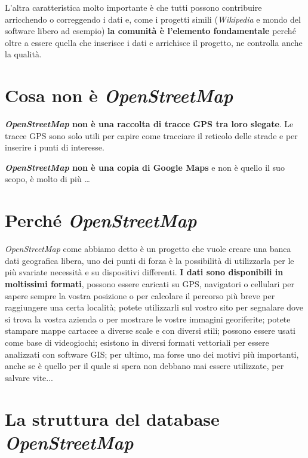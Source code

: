 \documentclass[a4paper,twoside,12pt,]{article}
\newcommand{\osm}{\emph{OpenStreetMap}\xspace}
\newcommand{\gps}{GPS\xspace}
\newcommand{\pro}[1]{\emph{#1}}
\begin{document}
L'altra caratteristica molto importante è che tutti possono contribuire arricchendo o correggendo i dati e, come i progetti simili (\pro{Wikipedia} e mondo del software libero ad esempio) \textbf{la comunità è l'elemento fondamentale} perché oltre a essere quella che inserisce i dati e arrichisce il progetto, ne controlla anche la qualità.
\section{Cosa non è \osm}
\textbf{\osm non è una raccolta di tracce \gps tra loro slegate}. Le tracce \gps sono solo utili per capire come tracciare il reticolo delle strade e per inserire i punti di interesse.

\textbf{\osm non è una copia di Google Maps} e non è quello il suo scopo, è molto di più \dots

\section{Perché \osm}
\osm come abbiamo detto è un progetto che vuole creare una banca dati geografica libera, uno dei punti di forza è la possibilità di utilizzarla per le più svariate necessità e su  dispositivi differenti. \textbf{I dati sono disponibili in moltissimi formati}, possono essere caricati su GPS, navigatori o cellulari per sapere sempre la vostra posizione o per calcolare il percorso più breve per raggiungere una certa località; potete utilizzarli sul vostro sito per segnalare dove si trova la vostra azienda o per mostrare le vostre immagini georiferite; potete stampare mappe cartacee a diverse scale e con diversi stili; possono essere usati come base di videogiochi; esistono in diversi formati vettoriali per essere analizzati con software GIS; per ultimo, ma forse uno dei motivi più importanti, anche se è quello per il quale si spera non debbano mai essere utilizzate, per salvare vite...

\section{La struttura del database \osm}
\end{document}
